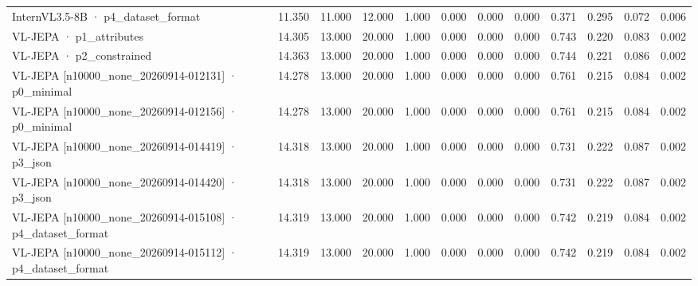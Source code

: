 \begin{tabular}{lrrrrrrrrrrr}
InternVL3.5-8B · p4\_dataset\_format & 11.350 & 11.000 & 12.000 & 1.000 & 0.000 & 0.000 & 0.000 & 0.371 & 0.295 & 0.072 & 0.006 \\
VL-JEPA · p1\_attributes & 14.305 & 13.000 & 20.000 & 1.000 & 0.000 & 0.000 & 0.000 & 0.743 & 0.220 & 0.083 & 0.002 \\
VL-JEPA · p2\_constrained & 14.363 & 13.000 & 20.000 & 1.000 & 0.000 & 0.000 & 0.000 & 0.744 & 0.221 & 0.086 & 0.002 \\
VL-JEPA [n10000\_none\_20260914-012131] · p0\_minimal & 14.278 & 13.000 & 20.000 & 1.000 & 0.000 & 0.000 & 0.000 & 0.761 & 0.215 & 0.084 & 0.002 \\
VL-JEPA [n10000\_none\_20260914-012156] · p0\_minimal & 14.278 & 13.000 & 20.000 & 1.000 & 0.000 & 0.000 & 0.000 & 0.761 & 0.215 & 0.084 & 0.002 \\
VL-JEPA [n10000\_none\_20260914-014419] · p3\_json & 14.318 & 13.000 & 20.000 & 1.000 & 0.000 & 0.000 & 0.000 & 0.731 & 0.222 & 0.087 & 0.002 \\
VL-JEPA [n10000\_none\_20260914-014420] · p3\_json & 14.318 & 13.000 & 20.000 & 1.000 & 0.000 & 0.000 & 0.000 & 0.731 & 0.222 & 0.087 & 0.002 \\
VL-JEPA [n10000\_none\_20260914-015108] · p4\_dataset\_format & 14.319 & 13.000 & 20.000 & 1.000 & 0.000 & 0.000 & 0.000 & 0.742 & 0.219 & 0.084 & 0.002 \\
VL-JEPA [n10000\_none\_20260914-015112] · p4\_dataset\_format & 14.319 & 13.000 & 20.000 & 1.000 & 0.000 & 0.000 & 0.000 & 0.742 & 0.219 & 0.084 & 0.002 \\
\bottomrule
\end{tabular}

